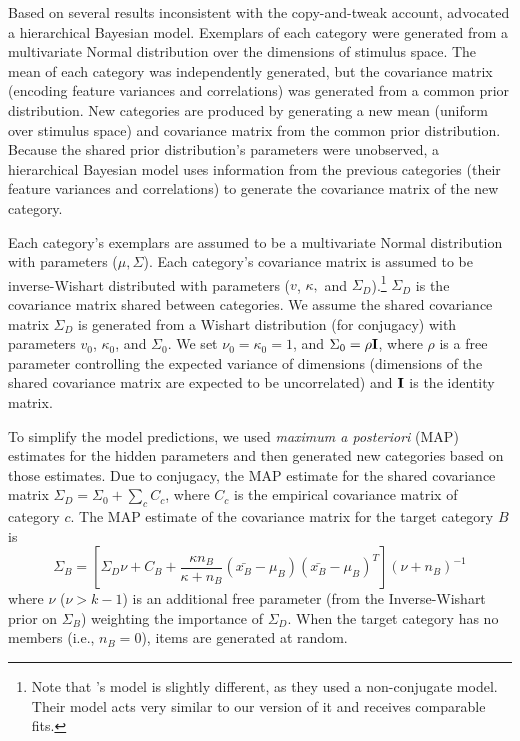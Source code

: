 \documentclass[10pt,letterpaper]{article}
\begin{document}
Based on several results inconsistent with the copy-and-tweak account, \citet{jern2013probabilistic} advocated a hierarchical Bayesian model. Exemplars of each category were generated from a multivariate Normal distribution over the dimensions of stimulus space. The mean of each category was independently generated, but the covariance matrix (encoding feature variances and correlations) was generated from a common prior distribution. New categories are produced by generating a new mean (uniform over stimulus space) and covariance matrix from the common prior distribution. Because the shared prior distribution's parameters were unobserved, a hierarchical Bayesian model uses information from the previous categories (their feature variances and correlations) to generate the covariance matrix of the new category.

Each category's exemplars are assumed to be a multivariate Normal distribution with parameters ($\mu, \Sigma$). Each category's covariance matrix is assumed to be inverse-Wishart distributed with parameters ($v$, $\kappa,$ and $\Sigma_D$).\footnote{Note that \citet{jern2013probabilistic}'s model is slightly different, as they used a non-conjugate model. Their model acts very similar to our version of it and receives comparable fits.} $\Sigma_D$ is the covariance matrix shared between categories. We assume the shared covariance matrix $\Sigma_D$ is generated from a Wishart distribution (for conjugacy) with parameters $v_0$, $\kappa_0$, and $\Sigma_0$. We set $\nu_0 = \kappa_0 = 1$, and $\Sigma_0 = \rho {\bf I}$, where $\rho$ is a free parameter controlling the expected variance of dimensions (dimensions of the shared covariance matrix are expected to be uncorrelated) and ${\bf I}$ is the identity matrix.

To simplify the model predictions, we used {\em maximum a posteriori} (MAP) estimates for the hidden parameters and then generated new categories based on those estimates. Due to conjugacy, the MAP estimate for the shared covariance matrix $\Sigma_D = \Sigma_0 + \sum_c{C_c}$, where $C_c$ is the empirical covariance matrix of category $c$. The MAP estimate of the covariance matrix for the target category $B$ is 
\begin{equation}
  \Sigma_B = \left[ \Sigma_D \nu + C_B +
    \dfrac
    {\kappa n_B}
    {\kappa + n_B}
    (\bar{x_B}-\mu_B)(\bar{x_B}-\mu_B)^T
  \right] (\nu + n_B)^{-1}
  \label{eq:Sigma_B}
\end{equation}
%
where $\nu$ ($\nu>k-1$) is an additional free parameter (from the Inverse-Wishart prior on $\Sigma_B$) weighting the importance of $\Sigma_{D}$. When the target category has no members (i.e., $n_B = 0$), items are generated at random.
\end{document}
